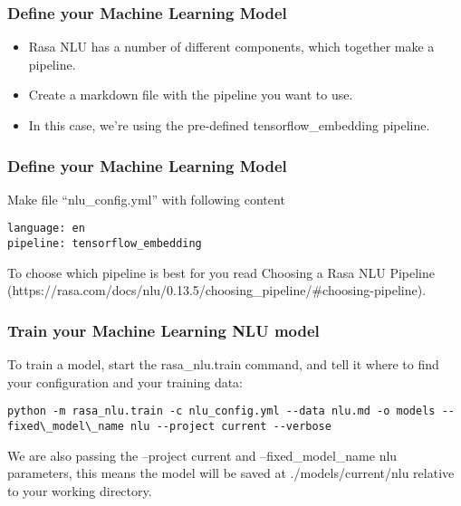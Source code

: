  \begin{frame}[fragile]\frametitle{Define your Machine Learning Model}
 \begin{itemize}
\item Rasa NLU has a number of different components, which together make a pipeline. 
\item Create a markdown file with the pipeline you want to use. 
\item In this case, we’re using the pre-defined tensorflow\_embedding pipeline.
\end{itemize}
\end{frame}


 \begin{frame}[fragile]\frametitle{Define your Machine Learning Model}
 Make file ``nlu\_config.yml'' with following content
 \scriptsize
\begin{lstlisting}
language: en
pipeline: tensorflow_embedding
\end{lstlisting}
To choose which pipeline is best for you read Choosing a Rasa NLU Pipeline (https://rasa.com/docs/nlu/0.13.5/choosing\_pipeline/\#choosing-pipeline).
\end{frame}

 \begin{frame}[fragile]\frametitle{Train your Machine Learning NLU model}
To train a model, start the rasa\_nlu.train command, and tell it where to find your configuration and your training data:
\begin{lstlisting}
python -m rasa_nlu.train -c nlu_config.yml --data nlu.md -o models --fixed\_model\_name nlu --project current --verbose
\end{lstlisting}
We are also passing the --project current and --fixed\_model\_name nlu parameters, this means the model will be saved at ./models/current/nlu relative to your working directory.

\end{frame}


